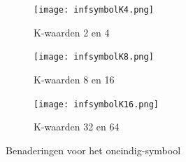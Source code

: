 \documentclass[a4paper, 12pt, titlepage]{report}
\begin{document}
\begin{figure}
\centering
\begin{subfigure}{.5\textwidth}
  \centering
  \texttt{[image: infsymbolK4.png]}
  \caption{K-waarden 2 en 4}
  \label{fig:sub1}
\end{subfigure}%
\begin{subfigure}{.5\textwidth}
  \centering
  \texttt{[image: infsymbolK8.png]}
  \caption{K-waarden 8 en 16}
  \label{fig:sub2}
\end{subfigure}
\begin{subfigure}{.5\textwidth}
  \centering
  \texttt{[image: infsymbolK16.png]}
  \caption{K-waarden 32 en 64}
  \label{fig:sub2}
\end{subfigure}
\caption{Benaderingen voor het oneindig-symbool}
\label{fig:test}
\end{figure}




 
 
\end{document}
